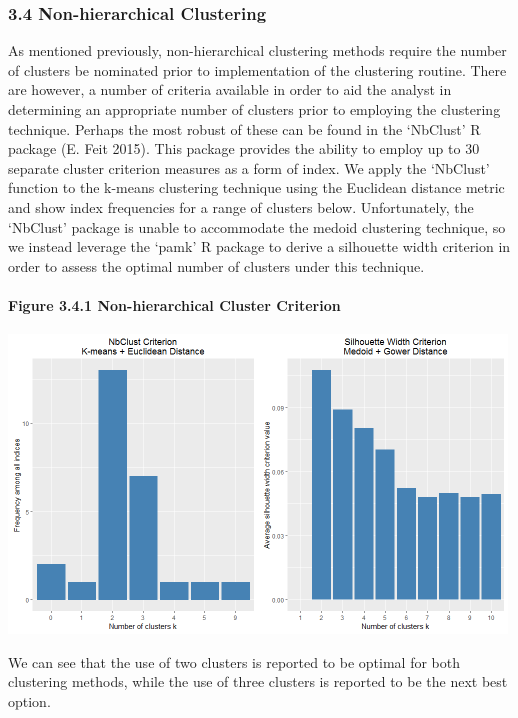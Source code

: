 \documentclass[]{article}
\let\oldparagraph\paragraph
\renewcommand{\paragraph}[1]{\oldparagraph{#1}\mbox{}}
\begin{document}
\subsubsection{3.4 Non-hierarchical
Clustering}\label{non-hierarchical-clustering}

As mentioned previously, non-hierarchical clustering methods require the
number of clusters be nominated prior to implementation of the
clustering routine. There are however, a number of criteria available in
order to aid the analyst in determining an appropriate number of
clusters prior to employing the clustering technique. Perhaps the most
robust of these can be found in the `NbClust' R package (E. Feit 2015).
This package provides the ability to employ up to 30 separate cluster
criterion measures as a form of index. We apply the `NbClust' function
to the k-means clustering technique using the Euclidean distance metric
and show index frequencies for a range of clusters below. Unfortunately,
the `NbClust' package is unable to accommodate the medoid clustering
technique, so we instead leverage the `pamk' R package to derive a
silhouette width criterion in order to assess the optimal number of
clusters under this technique.

\newpage

\paragraph{Figure 3.4.1 Non-hierarchical Cluster
Criterion}\label{figure-3.4.1-non-hierarchical-cluster-criterion}

\includegraphics[width=5.20833in]{images/nonhier_kcrit.png}

We can see that the use of two clusters is reported to be optimal for
both clustering methods, while the use of three clusters is reported to
be the next best option.
\end{document}
